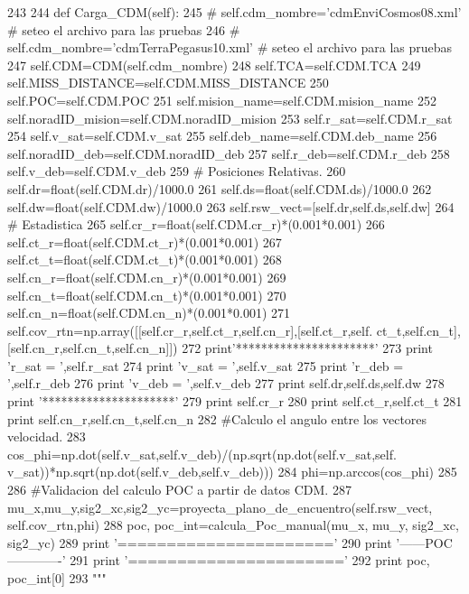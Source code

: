 \begin{DoxyCode}
243 
244     def Carga_CDM(self):
245 #        self.cdm_nombre='cdmEnviCosmos08.xml' # seteo el archivo para las
       pruebas
246 #        self.cdm_nombre='cdmTerraPegasus10.xml' # seteo el archivo para las
       pruebas
247         self.CDM=CDM(self.cdm_nombre)
248         self.TCA=self.CDM.TCA
249         self.MISS_DISTANCE=self.CDM.MISS_DISTANCE
250         self.POC=self.CDM.POC
251         self.mision_name=self.CDM.mision_name
252         self.noradID_mision=self.CDM.noradID_mision
253         self.r_sat=self.CDM.r_sat
254         self.v_sat=self.CDM.v_sat
255         self.deb_name=self.CDM.deb_name
256         self.noradID_deb=self.CDM.noradID_deb
257         self.r_deb=self.CDM.r_deb
258         self.v_deb=self.CDM.v_deb
259         # Posiciones Relativas.
260         self.dr=float(self.CDM.dr)/1000.0
261         self.ds=float(self.CDM.ds)/1000.0
262         self.dw=float(self.CDM.dw)/1000.0
263         self.rsw_vect=[self.dr,self.ds,self.dw]
264         # Estadistica 
265         self.cr_r=float(self.CDM.cr_r)*(0.001*0.001)
266         self.ct_r=float(self.CDM.ct_r)*(0.001*0.001)
267         self.ct_t=float(self.CDM.ct_t)*(0.001*0.001)
268         self.cn_r=float(self.CDM.cn_r)*(0.001*0.001)
269         self.cn_t=float(self.CDM.cn_t)*(0.001*0.001)
270         self.cn_n=float(self.CDM.cn_n)*(0.001*0.001) 
271         self.cov_rtn=np.array([[self.cr_r,self.ct_r,self.cn_r],[self.ct_r,self.
      ct_t,self.cn_t],[self.cn_r,self.cn_t,self.cn_n]])     
272         print'**********************'
273         print 'r_sat = ',self.r_sat
274         print 'v_sat = ',self.v_sat
275         print 'r_deb = ',self.r_deb
276         print 'v_deb = ',self.v_deb
277         print self.dr,self.ds,self.dw
278         print '*********************'
279         print self.cr_r
280         print self.ct_r,self.ct_t
281         print self.cn_r,self.cn_t,self.cn_n        
282         #Calculo el angulo entre los vectores velocidad.
283         cos_phi=np.dot(self.v_sat,self.v_deb)/(np.sqrt(np.dot(self.v_sat,self.
      v_sat))*np.sqrt(np.dot(self.v_deb,self.v_deb)))
284         phi=np.arccos(cos_phi) 
285     
286         #Validacion del calculo POC a partir de datos CDM.
287         mu_x,mu_y,sig2_xc,sig2_yc=proyecta_plano_de_encuentro(self.rsw_vect,
      self.cov_rtn,phi)
288         poc, poc_int=calcula_Poc_manual(mu_x, mu_y, sig2_xc, sig2_yc)
289         print '======================'
290         print '------POC-------------'
291         print '======================'
292         print poc, poc_int[0]
293         """

\end{DoxyCode}
